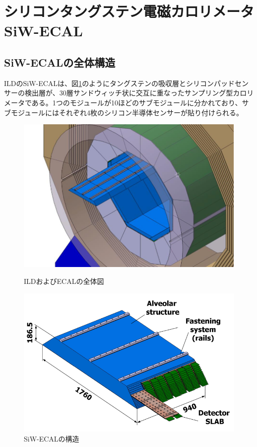\section{シリコンタングステン電磁カロリメータ SiW-ECAL}
\subsection{SiW-ECALの全体構造}
ILDのSiW-ECALは、図\ref{SiW-ECAL}のようにタングステンの吸収層とシリコンパッドセンサーの検出層が、30層サンドウィッチ状に交互に重なったサンプリング型カロリメータである。1つのモジュールが10ほどのサブモジュールに分かれており、サブモジュールにはそれぞれ4枚のシリコン半導体センサーが貼り付けられる。
\begin{figure}[h]
 \begin{minipage}[h]{.45\linewidth}
	\begin{center}
 \includegraphics[keepaspectratio, scale=0.8]
 	{Figure/Siwecal/ECAL.png}
 		\caption{ILDおよびECALの全体図\cite{tdr2}}
 		\label{ECAL}
	\end{center}
\end{minipage}
\hfill
\begin{minipage}[h]{.45\linewidth}
	\begin{center}
 \includegraphics[keepaspectratio, scale=0.8]
 	{Figure/Siwecal/SiW-ECAL.png}
 		\caption{SiW-ECALの構造}
 		\label{SiW-ECAL}
	\end{center}
\end{minipage}
\end{figure}

